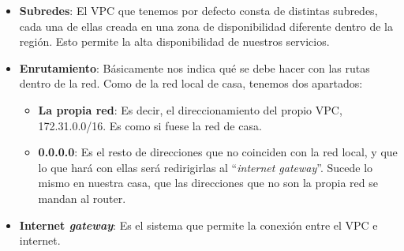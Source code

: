\begin{itemize}
	\item \textbf{Subredes}: El VPC que tenemos por defecto consta de distintas subredes, cada una de ellas creada en una zona de disponibilidad diferente dentro de la región. Esto permite la alta disponibilidad de nuestros servicios.
	
	\item \textbf{Enrutamiento}: Básicamente nos indica qué se debe hacer con las rutas dentro de la red. Como de la red local de casa, tenemos dos apartados:
	\begin{itemize}
		\item \textbf{La propia red}: Es decir, el direccionamiento del propio VPC, 172.31.0.0/16. Es como si fuese la red de casa.
		
		\item \textbf{0.0.0.0}: Es el resto de direcciones que no coinciden con la red local, y que lo que hará con ellas será redirigirlas al “\textit{internet gateway}”. Sucede lo mismo en nuestra casa, que las direcciones que no son la propia red se mandan al router.
	\end{itemize}
	
	\item \textbf{Internet \textit{gateway}}: Es el sistema que permite la conexión entre el VPC e internet.
\end{itemize}

